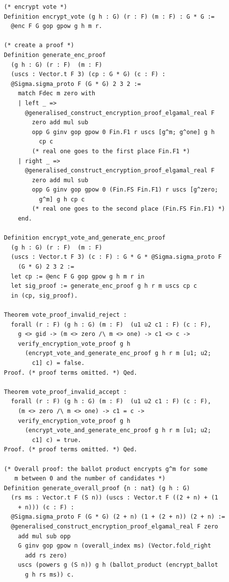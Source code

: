 \documentclass[sigconf,anonymous,review]{acmart}
\begin{document}
\begin{lstlisting}[frame=single, language=Coq, caption={Frontend Functions},
  label={frontend_fun},captionpos=t, basicstyle=\ttfamily\footnotesize,
  abovecaptionskip=-\medskipamount]
(* encrypt vote *)
Definition encrypt_vote (g h : G) (r : F) (m : F) : G * G :=
  @enc F G gop gpow g h m r.

(* create a proof *)
Definition generate_enc_proof 
  (g h : G) (r : F)  (m : F) 
  (uscs : Vector.t F 3) (cp : G * G) (c : F) : 
  @Sigma.sigma_proto F (G * G) 2 3 2 :=
    match Fdec m zero with 
    | left _ => 
      @generalised_construct_encryption_proof_elgamal_real F
        zero add mul sub 
        opp G ginv gop gpow 0 Fin.F1 r uscs [g^m; g^one] g h
          cp c 
        (* real one goes to the first place Fin.F1 *)
    | right _ =>  
      @generalised_construct_encryption_proof_elgamal_real F
        zero add mul sub 
        opp G ginv gop gpow 0 (Fin.FS Fin.F1) r uscs [g^zero;
          g^m] g h cp c 
        (* real one goes to the second place (Fin.FS Fin.F1) *)
    end.

Definition encrypt_vote_and_generate_enc_proof 
  (g h : G) (r : F)  (m : F) 
  (uscs : Vector.t F 3) (c : F) : G * G * @Sigma.sigma_proto F
    (G * G) 2 3 2 := 
  let cp := @enc F G gop gpow g h m r in
  let sig_proof := generate_enc_proof g h r m uscs cp c
  in (cp, sig_proof).

Theorem vote_proof_invalid_reject :
  forall (r : F) (g h : G) (m : F)  (u1 u2 c1 : F) (c : F),
    g <> gid -> (m <> zero /\ m <> one) -> c1 <> c ->
    verify_encryption_vote_proof g h 
      (encrypt_vote_and_generate_enc_proof g h r m [u1; u2;
        c1] c) = false.
Proof. (* proof terms omitted. *) Qed. 

Theorem vote_proof_invalid_accept :
  forall (r : F) (g h : G) (m : F)  (u1 u2 c1 : F) (c : F),
    (m <> zero /\ m <> one) -> c1 = c ->
    verify_encryption_vote_proof g h 
      (encrypt_vote_and_generate_enc_proof g h r m [u1; u2;
        c1] c) = true.
Proof. (* proof terms omitted. *) Qed.

(* Overall proof: the ballot product encrypts g^m for some 
   m between 0 and the number of candidates *)
Definition generate_overall_proof {n : nat} (g h : G) 
  (rs ms : Vector.t F (S n)) (uscs : Vector.t F ((2 + n) + (1
    + n))) (c : F) : 
  @Sigma.sigma_proto F (G * G) (2 + n) (1 + (2 + n)) (2 + n) :=
  @generalised_construct_encryption_proof_elgamal_real F zero
    add mul sub opp 
    G ginv gop gpow n (overall_index ms) (Vector.fold_right
      add rs zero) 
    uscs (powers g (S n)) g h (ballot_product (encrypt_ballot
      g h rs ms)) c.


\end{lstlisting}
\end{document}

